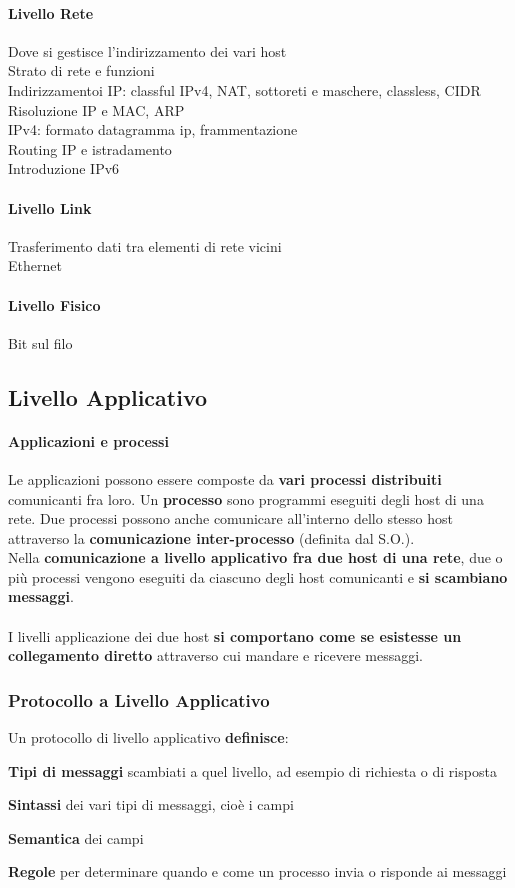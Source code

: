 \documentclass[10pt]{article}
\begin{document}
\begin{multicols}{2}
\paragraph{Livello Rete} Dove si gestisce l'indirizzamento dei vari host\\
Strato di rete e funzioni\\
Indirizzamentoi IP: classful IPv4, NAT, sottoreti e maschere, classless, CIDR\\
Risoluzione IP e MAC, ARP\\
IPv4: formato datagramma ip, frammentazione\\
Routing IP e istradamento\\
Introduzione IPv6
\paragraph{Livello Link} Trasferimento dati tra elementi di rete vicini\\
Ethernet
\paragraph{Livello Fisico} Bit sul filo
\end{multicols}
\pagebreak
\subsection{Livello Applicativo}
\paragraph{Applicazioni e processi} Le applicazioni possono essere composte da \textbf{vari processi distribuiti} comunicanti fra loro. Un \textbf{processo} sono programmi eseguiti degli host di una rete. Due processi possono anche comunicare all'interno dello stesso host attraverso la \textbf{comunicazione inter-processo} (definita dal S.O.).\\
Nella \textbf{comunicazione a livello applicativo fra due host di una rete}, due o più processi vengono eseguiti da ciascuno degli host comunicanti e \textbf{si scambiano messaggi}.\\\\
I livelli applicazione dei due host \textbf{si comportano come se esistesse un collegamento diretto} attraverso cui mandare e ricevere messaggi.
\subsubsection{Protocollo a Livello Applicativo}
Un protocollo di livello applicativo \textbf{definisce}:
\begin{list}{}{}
\item \textbf{Tipi di messaggi} scambiati a quel livello, ad esempio di richiesta o di risposta
\item \textbf{Sintassi} dei vari tipi di messaggi, cioè i campi
\item \textbf{Semantica} dei campi
\item \textbf{Regole} per determinare quando e come un processo invia o risponde ai messaggi
\end{list}
\end{document}

